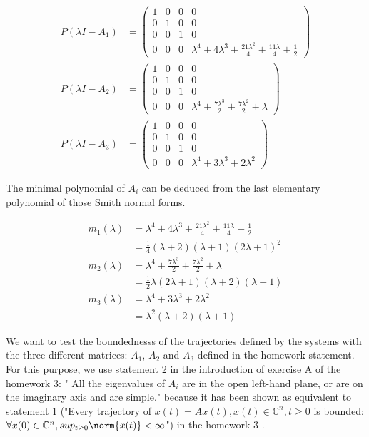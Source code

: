 \documentclass[11pt]{article}
\newcommand{\complex}{\mathbb{C}} %
\begin{document}
\begin{align*} P(\lambda I - A_{1}) &=
    \begin{pmatrix}
    1 & 0 & 0 & 0 \\
    0 & 1 & 0 & 0 \\
    0 & 0 & 1 & 0 \\
    0 & 0 & 0 & \lambda^{4} + 4 \lambda^{3} + \frac{21 \lambda^{2}}{4} + \frac{11 \lambda}{4} + \frac{1}{2}
    \end{pmatrix} \\
    P(\lambda I - A_{2}) &=
    \begin{pmatrix}
    1 & 0 & 0 & 0 \\
    0 & 1 & 0 & 0 \\
    0 & 0 & 1 & 0 \\
    0 & 0 & 0 & \lambda^{4} + \frac{7 \lambda^{3}}{2} + \frac{7 \lambda^{2}}{2} + \lambda
    \end{pmatrix} \\
    P(\lambda I - A_{3}) &=
    \begin{pmatrix}
    1 & 0 & 0 & 0 \\
    0 & 1 & 0 & 0 \\
    0 & 0 & 1 & 0 \\
    0 & 0 & 0 & \lambda^{4} + 3 \lambda^{3} + 2 \lambda^{2}
    \end{pmatrix}
\end{align*}

The minimal polynomial of $A_{i}$ can be deduced from the last elementary polynomial of those Smith normal forms.

\begin{align*}
    m_{1}(\lambda) &= \lambda^{4} + 4 \lambda^{3} + \frac{21 \lambda^{2}}{4} + \frac{11 \lambda}{4} + \frac{1}{2} \\
    &= \frac{1}{4} (\lambda + 2) (\lambda + 1) (2 \lambda + 1)^{2} \\
    m_{2}(\lambda) &= \lambda^{4} + \frac{7 \lambda^{3}}{2} + \frac{7 \lambda^{2}}{2} + \lambda \\
    &= \frac{1}{2} \lambda (2 \lambda + 1) (\lambda + 2) (\lambda + 1) \\
    m_{3}(\lambda) &= \lambda^{4} + 3 \lambda^{3} + 2 \lambda^{2} \\
    &= \lambda^{2} (\lambda + 2) (\lambda + 1)
\end{align*}

We want to test the boundednesss of the trajectories defined by the systems with the three different matrices: $A_1$, $A_2$ and $A_3$ defined in the homework statement. For this purpose, we use statement 2 in the introduction of exercise A of the homework 3: " All the eigenvalues of $A_{i}$ are in the open left-hand plane, or are on the imaginary axis and are simple." because it has been shown as equivalent to statement 1 ("Every trajectory of $\dot{x}(t) = A x(t), x(t) \in \complex^{n}, t\geq 0$ is bounded: $\forall x(0) \in \complex^{n}, sup_{t\geq0} \norm{x(t)} < \infty$") in the homework 3 .
\end{document}
